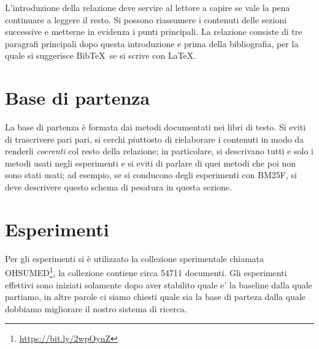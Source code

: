 \documentclass[runningheads]{llncs}
\begin{document}
L'introduzione della relazione deve servire al lettore a capire se
vale la pena continuare a leggere il resto.  Si possono riassumere i
contenuti delle sezioni successive e metterne in evidenza i punti
principali.  La relazione consiste di tre paragrafi principali dopo
questa introduzione e prima della bibliografia, per la quale si
suggerisce Bib\TeX\ se si scrive con \LaTeX.

\section{Base di partenza}
\label{sec:base-di-partenza}

La base di partenza \`e formata dai metodi documentati nei libri di
testo.  Si eviti di trascrivere pari pari, si cerchi piuttosto di
rielaborare i contenuti in modo da renderli \emph{coerenti} col resto
della relazione; in particolare, si descrivano tutti e solo i metodi
usati negli esperimenti e si eviti di parlare di quei metodi che poi
non sono stati usati; ad esempio, se si conducono degli esperimenti
con BM25F, si deve descrivere questo schema di pesatura in questa
sezione.
%
%

\section{Esperimenti}
\label{sec:esperimenti}


Per gli esperimenti si \`e utilizzato la collezione sperimentale 
chiamata OHSUMED\footnote{ \url{https://bit.ly/2wpOynZ}}, la collezione contiene circa 54711 documenti.
Gli esperimenti effettivi sono iniziati solamente dopo aver stabilito quale
e' la baseline dalla quale partiamo, in altre parole ci siamo chiesti quale
sia la base di parteza dalla quale dobbiamo migliorare il nostro sistema 
di ricerca.  \par
\end{document}

